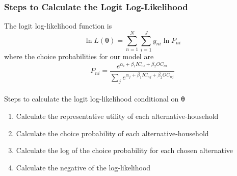 \documentclass{beamer}\usepackage[]{graphicx}\usepackage[]{xcolor}
\begin{document}
\begin{frame}\frametitle{Steps to Calculate the Logit Log-Likelihood}
    The logit log-likelihood function is
    $$\ln L(\bm{\theta}) = \sum_{n = 1}^N \sum_{i = 1}^J y_{ni} \ln P_{ni}$$
    where the choice probabilities for our model are
    $$P_{ni} = \frac{e^{\alpha_i + \beta_1 IC_{ni} + \beta_2 OC_{ni}}}{\sum_j e^{\alpha_j + \beta_1 IC_{nj} + \beta_2 OC_{nj}}}$$ \\
    \vspace{2ex}
    Steps to calculate the logit log-likelihood conditional on $\bm{\theta}$
    \begin{enumerate}
        \item Calculate the representative utility of each alternative-household
        \item Calculate the choice probability of each alternative-household
        \item Calculate the log of the choice probability for each chosen alternative
        \item Calculate the negative of the log-likelihood
    \end{enumerate}
\end{frame}
\end{document}
